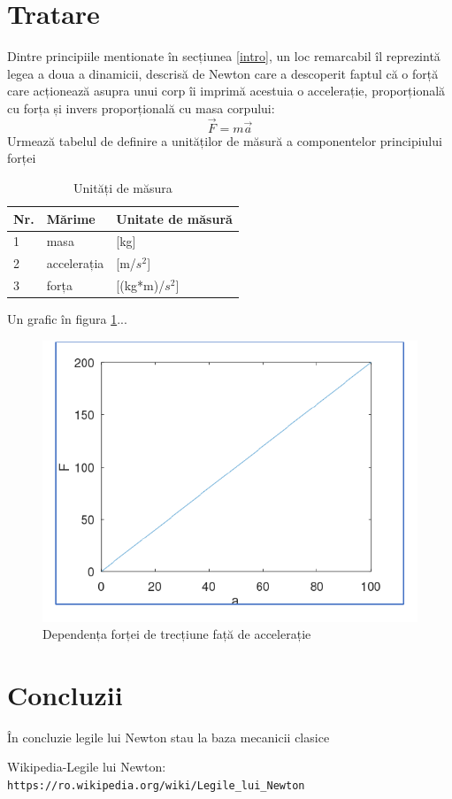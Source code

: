 \documentclass{article}
\begin{document}
\section{Tratare}
Dintre principiile mentionate în secțiunea \ref{intro}, un loc remarcabil îl reprezintă legea a doua a dinamicii, descrisă de Newton care a descoperit faptul că o forță care acționează asupra unui corp îi imprimă acestuia o accelerație, proporțională cu forța și invers proporțională cu masa corpului:
\begin{equation}
\vec{F}=m\vec{a}
\end{equation}
Urmează tabelul de definire a unităților de măsură a componentelor principiului forței 
\begin{table}[htbp]
\centering
\caption{Unități de măsura}\label{tab:unit}
\begin{tabular}{lll}
\hline
Nr.&Mărime&Unitate de măsură\\\hline
1 &masa &[kg]\\\hline
2&accelerația&[m/$s^2$]\\\hline
3&forța&[(kg*m)/$s^2$]
\end{tabular}
\end{table}
Un grafic în figura \ref{fig:figura}...
\begin{figure}[ht]
\centering
\includegraphics[scale=0.8]{figura.pdf}
\caption{Dependența forței de trecțiune față de accelerație}\label{fig:figura}
\end{figure}
\section{Concluzii}
În concluzie legile lui Newton stau la baza mecanicii clasice
\begin{thebibliography}{a}
 Wikipedia-Legile lui Newton: \verb+https://ro.wikipedia.org/wiki/Legile_lui_Newton+
\end{thebibliography}
\end{document}
